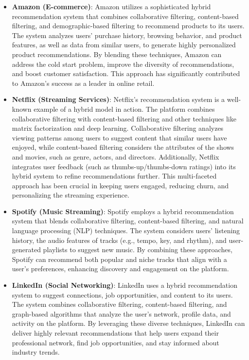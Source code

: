 \documentclass{article}
\begin{document}
\begin{itemize}
    \item \textbf{Amazon (E-commerce)}: Amazon utilizes a sophisticated hybrid recommendation system that combines collaborative filtering, content-based filtering, and demographic-based filtering to recommend products to its users. The system analyzes users' purchase history, browsing behavior, and product features, as well as data from similar users, to generate highly personalized product recommendations. By blending these techniques, Amazon can address the cold start problem, improve the diversity of recommendations, and boost customer satisfaction. This approach has significantly contributed to Amazon's success as a leader in online retail.
    \item \textbf{Netflix (Streaming Services)}: Netflix's recommendation system is a well-known example of a hybrid model in action. The platform combines collaborative filtering with content-based filtering and other techniques like matrix factorization and deep learning. Collaborative filtering analyzes viewing patterns among users to suggest content that similar users have enjoyed, while content-based filtering considers the attributes of the shows and movies, such as genre, actors, and directors. Additionally, Netflix integrates user feedback (such as thumbs-up/thumbs-down ratings) into its hybrid system to refine recommendations further. This multi-faceted approach has been crucial in keeping users engaged, reducing churn, and personalizing the streaming experience.
    \item \textbf{Spotify (Music Streaming)}: Spotify employs a hybrid recommendation system that blends collaborative filtering, content-based filtering, and natural language processing (NLP) techniques. The system considers users' listening history, the audio features of tracks (e.g., tempo, key, and rhythm), and user-generated playlists to suggest new music. By combining these approaches, Spotify can recommend both popular and niche tracks that align with a user's preferences, enhancing discovery and engagement on the platform.
    \item \textbf{LinkedIn (Social Networking)}: LinkedIn uses a hybrid recommendation system to suggest connections, job opportunities, and content to its users. The system combines collaborative filtering, content-based filtering, and graph-based algorithms that analyze the user's network, profile data, and activity on the platform. By leveraging these diverse techniques, LinkedIn can deliver highly relevant recommendations that help users expand their professional network, find job opportunities, and stay informed about industry trends.
\end{itemize}
\end{document}

